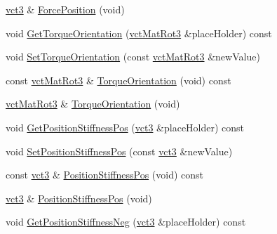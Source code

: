 \begin{DoxyCompactItemize}
\item 
\hyperlink{vct_fixed_size_vector_types_8h_a3af82acdbf4eeb73c551909240b106ea}{vct3} \& \hyperlink{classprm_fixture_gain_cartesian_set_a5cd1d3ef930e690cc4a9ac5a5d42f6fb}{Force\+Position} (void)
\item 
void \hyperlink{classprm_fixture_gain_cartesian_set_a47de592368ff62a4d1c1e94a93111a6e}{Get\+Torque\+Orientation} (\hyperlink{vct_transformation_types_8h_a30fe23c1d38748a9b8f2fb9bb2471382}{vct\+Mat\+Rot3} \&place\+Holder) const 
\item 
void \hyperlink{classprm_fixture_gain_cartesian_set_a8bcfae0432259a501726c5002730b914}{Set\+Torque\+Orientation} (const \hyperlink{vct_transformation_types_8h_a30fe23c1d38748a9b8f2fb9bb2471382}{vct\+Mat\+Rot3} \&new\+Value)
\item 
const \hyperlink{vct_transformation_types_8h_a30fe23c1d38748a9b8f2fb9bb2471382}{vct\+Mat\+Rot3} \& \hyperlink{classprm_fixture_gain_cartesian_set_a83e0c0e672126a69fb3f65f6f7a744b5}{Torque\+Orientation} (void) const 
\item 
\hyperlink{vct_transformation_types_8h_a30fe23c1d38748a9b8f2fb9bb2471382}{vct\+Mat\+Rot3} \& \hyperlink{classprm_fixture_gain_cartesian_set_ad87617798440989b0ae378db5bf08b1e}{Torque\+Orientation} (void)
\item 
void \hyperlink{classprm_fixture_gain_cartesian_set_a8fb49f7495f0fc008620c27cf6d09d94}{Get\+Position\+Stiffness\+Pos} (\hyperlink{vct_fixed_size_vector_types_8h_a3af82acdbf4eeb73c551909240b106ea}{vct3} \&place\+Holder) const 
\item 
void \hyperlink{classprm_fixture_gain_cartesian_set_a18291351c7d0cd9e10be3bd2e09c7ffe}{Set\+Position\+Stiffness\+Pos} (const \hyperlink{vct_fixed_size_vector_types_8h_a3af82acdbf4eeb73c551909240b106ea}{vct3} \&new\+Value)
\item 
const \hyperlink{vct_fixed_size_vector_types_8h_a3af82acdbf4eeb73c551909240b106ea}{vct3} \& \hyperlink{classprm_fixture_gain_cartesian_set_ac8a7c4d1370e312e53932c71d34aacb3}{Position\+Stiffness\+Pos} (void) const 
\item 
\hyperlink{vct_fixed_size_vector_types_8h_a3af82acdbf4eeb73c551909240b106ea}{vct3} \& \hyperlink{classprm_fixture_gain_cartesian_set_a969b7e29060ed570104c4f1dac83e8f1}{Position\+Stiffness\+Pos} (void)
\item 
void \hyperlink{classprm_fixture_gain_cartesian_set_a0ddb1c15b90fc5b269a64fa2d44806c6}{Get\+Position\+Stiffness\+Neg} (\hyperlink{vct_fixed_size_vector_types_8h_a3af82acdbf4eeb73c551909240b106ea}{vct3} \&place\+Holder) const 

\end{DoxyCompactItemize}
